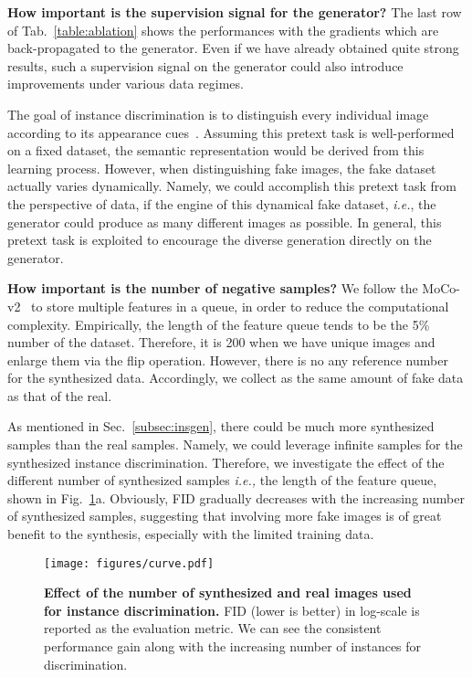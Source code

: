\documentclass{article}
\begin{document}
\noindent\textbf{How important is the supervision signal for the generator?}
The last row of Tab.~\ref{table:ablation} shows the performances with the gradients which are back-propagated to the generator. Even if we have already obtained quite strong results, such a supervision signal on the generator could also introduce improvements under various data regimes.


The goal of instance discrimination is to distinguish every individual image according to its appearance cues~\cite{wu2018unsupervised}. Assuming this pretext task is well-performed on a fixed dataset, the semantic representation would be derived from this learning process. However, when distinguishing fake images, the fake dataset actually varies dynamically. Namely, we could accomplish this pretext task from the perspective of data, if the engine of this dynamical fake dataset, \textit{i.e.}, the generator could produce as many different images as possible. In general, this pretext task is exploited to encourage the diverse generation directly on the generator.


\noindent\textbf{How important is the number of negative samples?}
We follow the MoCo-v2~\cite{chen2020mocov2} to store multiple features in a queue, in order to reduce the computational complexity. Empirically, the length of the feature queue tends to be the 5\% number of the dataset. Therefore, it is 200 when we have  unique images and enlarge them via the flip operation. However, there is no any reference number for the synthesized data. Accordingly, we collect as the same amount of fake data as that of the real.


As mentioned in Sec.~\ref{subsec:insgen}, there could be much more synthesized samples than the real samples. Namely, we could leverage infinite samples for the synthesized instance discrimination. Therefore, we investigate the effect of the different number of synthesized samples \textit{i.e.,} the length of the feature queue, shown in Fig.~\ref{fig:curve}a.
Obviously, FID gradually decreases with the increasing number of synthesized samples, suggesting that involving more fake images is of great benefit to the synthesis, especially with the limited training data.


\begin{figure}[t]
	\centering
	\texttt{[image: figures/curve.pdf]}
	\vspace{-20pt}
	\caption{
	    \textbf{Effect of the number of synthesized and real images used for instance discrimination.}
FID (lower is better) in log-scale is reported as the evaluation metric.
We can see the consistent performance gain along with the increasing number of instances for discrimination.
	}
    \label{fig:curve}
    \vspace{-5pt}
\end{figure}
\end{document}
